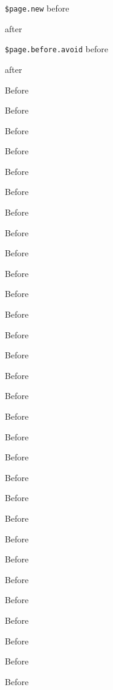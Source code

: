 \documentclass[demo]{pyscribe}
\begin{document}
\par\medskip
\texttt{\$page.new} before \par \newpage \par after
\par\medskip
\texttt{\$page.before.avoid} before \par \nopagebreak[4] \par after
\par Before \par Before \par Before \par Before \par Before \par Before \par Before \par Before \par Before \par Before \par Before \par Before \par Before \par Before \par Before \par Before \par Before \par Before \par Before \par Before \par Before \par Before \par Before \par Before \par Before \par Before \par Before \par Before \par Before \par Before \par
\par\medskip
\end{document}
